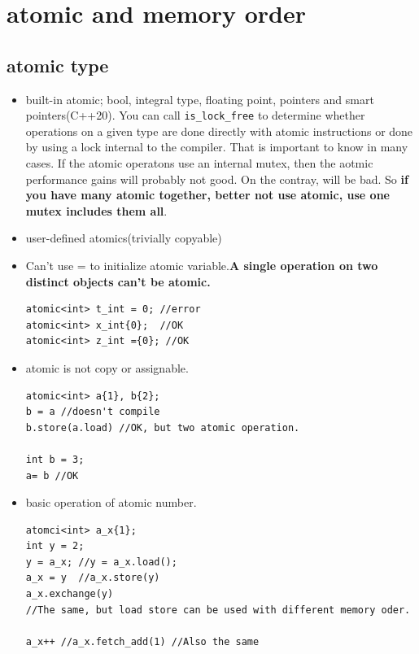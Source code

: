 \documentclass[a4paper,11pt,twoside]{book}
\begin{document}
\section{atomic and memory order}
\subsection{atomic type}
\begin{itemize}

	\item built-in atomic; bool, integral type, floating point, pointers and smart pointers(C++20).  You can call \texttt{is\_lock\_free} to determine whether operations on a given type are done directly with atomic instructions or done by using a lock internal to the compiler. That is important to know in many cases. If the atomic operatons use an internal mutex, then the aotmic performance gains will probably not good. On the contray, will be bad. So \textbf{if you have many atomic together, better not use atomic, use one mutex includes them all}.
	
	\item user-defined atomics(trivially copyable)

	\item Can't use = to initialize atomic variable.\textbf{A single operation on two distinct objects can't be atomic.}

\begin{lstlisting}[numbers=none]
atomic<int> t_int = 0; //error
atomic<int> x_int{0};  //OK
atomic<int> z_int ={0}; //OK
\end{lstlisting}	

	\item atomic is not copy or assignable.
\begin{lstlisting}[numbers=none]
atomic<int> a{1}, b{2};
b = a //doesn't compile
b.store(a.load) //OK, but two atomic operation.

int b = 3;
a= b //OK	
\end{lstlisting}	

	\item basic operation of atomic number. 
\begin{lstlisting}[numbers=none]
atomci<int> a_x{1};
int y = 2;
y = a_x; //y = a_x.load();
a_x = y  //a_x.store(y) 
a_x.exchange(y) 
//The same, but load store can be used with different memory oder.

a_x++ //a_x.fetch_add(1) //Also the same
\end{lstlisting}	


\end{itemize}
\end{document}
